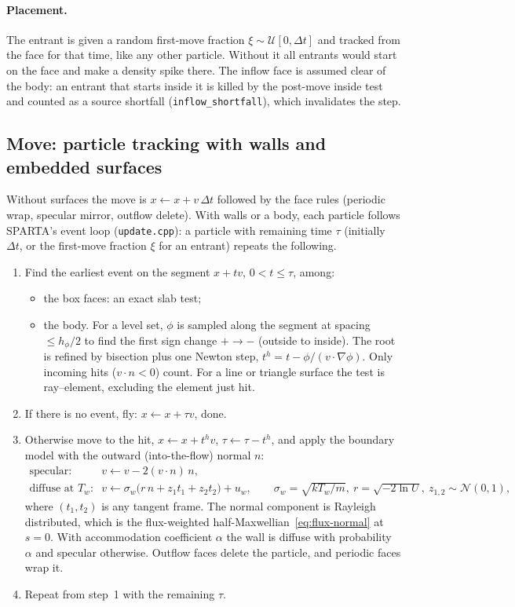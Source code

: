 \documentclass[11pt,a4paper]{article}
\numberwithin{equation}{section}
\newcommand{\code}[1]{\texttt{#1}}
\begin{document}
\paragraph{Placement.}
The entrant is given a random first-move fraction $\xi\sim\mathcal U[0,\Delta t]$ and
tracked from the face for that time, like any other particle.  Without it all
entrants would start on the face and make a density spike there.  The inflow face is
assumed clear of the body: an entrant that starts inside it is killed by the post-move
inside test and counted as a source shortfall (\code{inflow\_shortfall}), which
invalidates the step.

\subsection{Move: particle tracking with walls and embedded surfaces}
\label{sec:primer-move}
Without surfaces the move is $x\leftarrow x + v\,\Delta t$ followed by the face rules
(periodic wrap, specular mirror, outflow delete).  With walls or a body, each particle
follows SPARTA's event loop (\code{update.cpp}): a particle with remaining time
$\tau$ (initially $\Delta t$, or the first-move fraction $\xi$ for an entrant)
repeats the following.
\begin{enumerate}
\item Find the earliest event on the segment $x + t v$, $0 < t \le \tau$, among:
  \begin{itemize}
  \item the box faces: an exact slab test;
  \item the body.  For a level set, $\phi$ is sampled along the segment at spacing
    $\le h_\phi/2$ to find the first sign change $+\to-$ (outside to inside).  The
    root is refined by bisection plus one Newton step,
    $t^h = t - \phi/(v\cdot\nabla\phi)$.  Only incoming hits ($v\cdot n < 0$)
    count.  For a line or triangle surface the test is ray--element, excluding the
    element just hit.
  \end{itemize}
\item If there is no event, fly: $x \leftarrow x + \tau v$, done.
\item Otherwise move to the hit, $x\leftarrow x + t^h v$, $\tau\leftarrow\tau - t^h$, and
  apply the boundary model with the outward (into-the-flow) normal $n$:
  \begin{align}
  \text{specular:}\quad & v \leftarrow v - 2(v\cdot n)\,n, \label{eq:specular}\\
  \text{diffuse at } T_w:\quad & v \leftarrow \sigma_w\big(r\,n + z_1 t_1 + z_2 t_2\big) + u_w,
  \qquad \sigma_w = \sqrt{kT_w/m},\ r = \sqrt{-2\ln U},\ z_{1,2}\sim\mathcal N(0,1),
  \label{eq:diffuse}
  \end{align}
  where $(t_1, t_2)$ is any tangent frame.  The normal component is Rayleigh
  distributed, which is the flux-weighted half-Maxwellian~\eqref{eq:flux-normal} at
  $s = 0$.  With accommodation coefficient $\alpha$ the wall is diffuse with
  probability $\alpha$ and specular otherwise.  Outflow faces delete the particle,
  and periodic faces wrap it.
\item Repeat from step~1 with the remaining $\tau$.
\end{enumerate}
\end{document}
